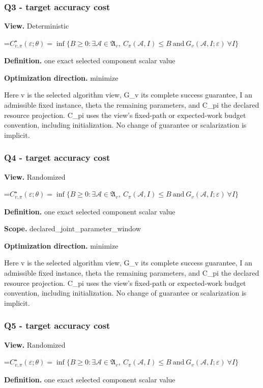 \documentclass[10pt,a4paper]{article}
\newcommand{\AtlasMath}[1]{\par\begingroup\centering\setbox0=\hbox{$\displaystyle #1$}\ifdim\wd0>1.4\linewidth\typeout{ATLAS WIDE FORMULA: \the\wd0}\fi\ifdim\wd0>\linewidth\resizebox{\linewidth}{!}{\box0}\else\box0\fi\par\endgroup}
\begin{document}
\subsubsection{Q3 - target accuracy cost}
\textbf{View.} Deterministic

\AtlasMath{C^\star_{v,\pi}(\varepsilon;\theta)=\inf\{B\ge0:\exists\mathcal A\in\mathfrak A_v,\ C_\pi(\mathcal A,I)\le B\ \text{and}\ G_v(\mathcal A,I;\varepsilon)\ \forall I\}}
\textbf{Definition.} one exact selected component scalar value

\textbf{Optimization direction.} minimize

Here v is the selected algorithm view, G\_v its complete success guarantee, I an admissible fixed instance, theta the remaining parameters, and C\_pi the declared resource projection. C\_pi uses the view's fixed-path or expected-work budget convention, including initialization. No change of guarantee or scalarization is implicit.

\subsubsection{Q4 - target accuracy cost}
\textbf{View.} Randomized

\AtlasMath{C^\star_{v,\pi}(\varepsilon;\theta)=\inf\{B\ge0:\exists\mathcal A\in\mathfrak A_v,\ C_\pi(\mathcal A,I)\le B\ \text{and}\ G_v(\mathcal A,I;\varepsilon)\ \forall I\}}
\textbf{Definition.} one exact selected component scalar value

\textbf{Scope.} declared\_joint\_parameter\_window

\textbf{Optimization direction.} minimize

Here v is the selected algorithm view, G\_v its complete success guarantee, I an admissible fixed instance, theta the remaining parameters, and C\_pi the declared resource projection. C\_pi uses the view's fixed-path or expected-work budget convention, including initialization. No change of guarantee or scalarization is implicit.

\subsubsection{Q5 - target accuracy cost}
\textbf{View.} Randomized

\AtlasMath{C^\star_{v,\pi}(\varepsilon;\theta)=\inf\{B\ge0:\exists\mathcal A\in\mathfrak A_v,\ C_\pi(\mathcal A,I)\le B\ \text{and}\ G_v(\mathcal A,I;\varepsilon)\ \forall I\}}
\textbf{Definition.} one exact selected component scalar value
\end{document}
